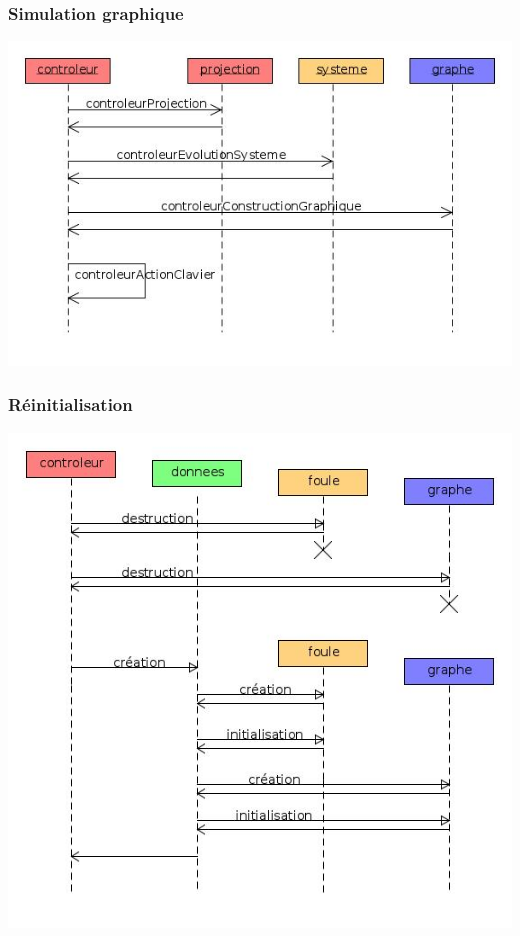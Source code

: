 \subsubsection{Simulation graphique}
\includegraphics[width=.95\textwidth]{./illustration/sequenceControleur}
%
\newpage
%
\subsubsection{Réinitialisation}
\includegraphics[width=.95\textwidth]{./illustration/sequenceReinitialisation2}

